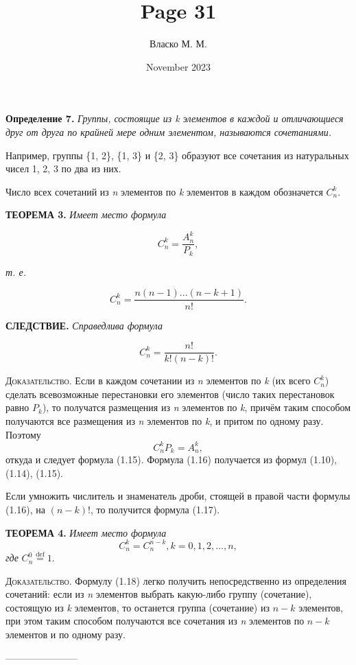 \documentclass{article}
\title{Page 31}
\author{Власко М. М.}
\date{November 2023}
\begin{document}
\Large
\textsf{\textbf{Определение 7.}}
\textit{Группы, состоящие из k элементов в каждой и отличающиеся друг от друга по крайней мере одним элементом,
    называются сочетаниями.}

Например, группы \{1, 2\}, \{1, 3\} и \{2, 3\} образуют все сочетания из натуральных чисел 1, 2, 3 по два из них.

Число всех сочетаний из \textit{n} элементов по \textit{k} элементов в каждом обозначется \(C_n^k\).


\begin{flushleft}
   \textsc{\textbf{ТЕОРЕМА 3. }}\textit{Имеет место формула}
\end{flushleft}

\[ C_n^k = \frac{A_n^k}{P_k}, \tag{1.15}\]
\begin{flushleft}
   \textit{т. е.}
\end{flushleft}
\[ C_n^k = \frac{n(n - 1)...(n - k + 1)}{n!}. \tag{1.16}\]
\begin{flushleft}
   \textsc{\textbf{СЛЕДСТВИЕ. }}\textit{Справедлива формула}
\end{flushleft}
\[ C_n^k = \frac{n!}{k!(n - k)!}. \tag{1.17}\]

\begin{flushleft}
   \textsc{Доказательство.}
Если в каждом сочетании из \textit{n} элементов по \textit{k} (их всего \(C_n^k\)) сделать всевозможные перестановки
   его элементов (число таких перестановок равно \(P_k\)), то получатся размещения из \textit{n} элементов по
   \textit{k}, причём таким способом получаются все размещения из \textit{n} элементов по \textit{k}, и притом по
   одному разу. Поэтому \[ C_n^kP_k = A_n^k,\] откуда и следует формула (1.15).
   Формула (1.16) получается из формул
   (1.10), (1.14), (1.15).
\end{flushleft}
\par{Если умножить числитель и знаменатель дроби, стоящей в правой части формулы (1.16), на \((n - k)\)!, то
получится формула (1.17).}
\begin{flushleft}
   \textsc{\textbf{ТЕОРЕМА 4. }}\textit{Имеет место формула}
   \[ C_n^k = C_n^{n - k}, k = 0, 1, 2, \dots, n, \tag{1.18}\]
\textit{где} \(C_n^0 \stackrel{\text{def}}{=} 1\).
\end{flushleft}
\begin{flushleft}
   \textsc{\textsf{Доказательство.}}
Формулу (1.18) легко получить непосредственно из определения сочетаний: если из \textit{n} элементов выбрать какую-либо
   группу (сочетание), состоящую из \textit{k} элементов, то останется группа (сочетание) из \(n - k\) элементов, при
   этом таким способом получаются все сочетания из \textit{n} элементов по \(n - k\) элементов и по одному разу.
\end{flushleft}

\centering
-----------------------
\end{document}
